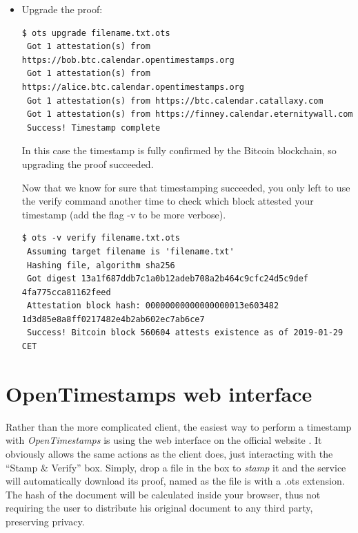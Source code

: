 \begin{itemize}
\begin{lstlisting}[breakatwhitespace=true]
\end{lstlisting}
Incomplete timestamps can be upgraded using the \colorbox{light-gray}{upgrade} command which adds the path to the relative block header merkleroot to the proof. Upgrading a proof isn't always available: there must be at least one completed attestation\footnote{That is, at least one of the four public calendars in question must have received an attestation from the Bitcoin blockchain.}.
\item Upgrade the proof: \bigskip
\begin{lstlisting}[breakatwhitespace=true]
 $ ots upgrade filename.txt.ots 
 Got 1 attestation(s) from https://bob.btc.calendar.opentimestamps.org
 Got 1 attestation(s) from https://alice.btc.calendar.opentimestamps.org
 Got 1 attestation(s) from https://btc.calendar.catallaxy.com
 Got 1 attestation(s) from https://finney.calendar.eternitywall.com
 Success! Timestamp complete
\end{lstlisting}
In this case the timestamp is fully confirmed by the Bitcoin blockchain, so upgrading the proof succeeded.

\bigskip
\noindent
Now that we know for sure that timestamping succeeded, you only left to use the \colorbox{light-gray}{verify} command another time to check which block attested your timestamp (add the flag \colorbox{light-gray}{-v} to be more verbose).\bigskip
\begin{lstlisting}[breakatwhitespace=true]
 $ ots -v verify filename.txt.ots
 Assuming target filename is 'filename.txt'
 Hashing file, algorithm sha256
 Got digest 13a1f687ddb7c1a0b12adeb708a2b464c9cfc24d5c9def 4fa775cca81162feed
 Attestation block hash: 00000000000000000013e603482 1d3d85e8a8ff0217482e4b2ab602ec7ab6ce7
 Success! Bitcoin block 560604 attests existence as of 2019-01-29 CET
\end{lstlisting}
\end{itemize}

\bigskip
\section{OpenTimestamps web interface}
Rather than the more complicated client, the easiest way to perform a timestamp with \textit{OpenTimestamps} is using the web interface on the official website \cite{OTSWeb}. It obviously allows the same actions as the client does, just interacting with the \enquote{Stamp \& Verify} box. Simply, drop a file in the box to \textit{stamp} it and the service will automatically download its proof, named as the file is with a \colorbox{light-gray}{.ots} extension. The hash of the document will be calculated inside your browser, thus not requiring the user to distribute his original document to any third party, preserving privacy.

